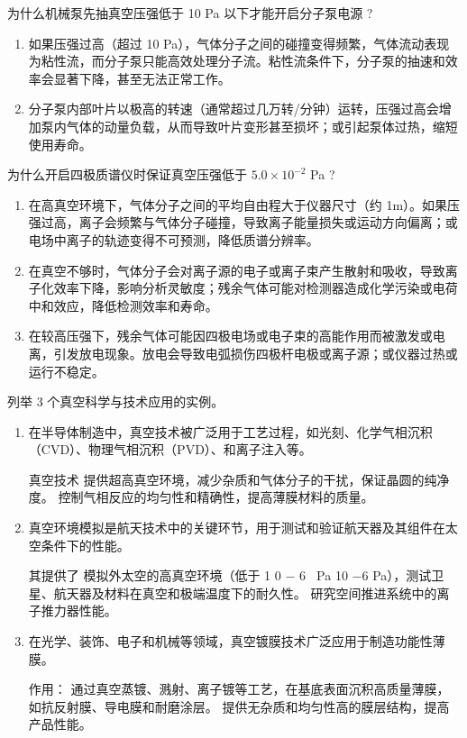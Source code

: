 \documentclass[dvipsnames, svgnames,a4paper,11pt]{article}
\begin{document}
\begin{question}
	为什么机械泵先抽真空压强低于 10 Pa 以下才能开启分子泵电源 ?
\end{question}

	\begin{enumerate}
		\item 如果压强过高（超过 10 Pa），气体分子之间的碰撞变得频繁，气体流动表现为粘性流，而分子泵只能高效处理分子流。粘性流条件下，分子泵的抽速和效率会显著下降，甚至无法正常工作。
		\item 分子泵内部叶片以极高的转速（通常超过几万转/分钟）运转，压强过高会增加泵内气体的动量负载，从而导致叶片变形甚至损坏；或引起泵体过热，缩短使用寿命。
	\end{enumerate}



\begin{question}
	为什么开启四极质谱仪时保证真空压强低于 $5.0 \times 10^{-2}$ Pa ?
\end{question}
	
	\begin{enumerate}
		\item 在高真空环境下，气体分子之间的平均自由程大于仪器尺寸（约 1m）。如果压强过高，离子会频繁与气体分子碰撞，导致离子能量损失或运动方向偏离；或电场中离子的轨迹变得不可预测，降低质谱分辨率。
		\item 在真空不够时，气体分子会对离子源的电子或离子束产生散射和吸收，导致离子化效率下降，影响分析灵敏度；残余气体可能对检测器造成化学污染或电荷中和效应，降低检测效率和寿命。
		\item 在较高压强下，残余气体可能因四极电场或电子束的高能作用而被激发或电离，引发放电现象。放电会导致电弧损伤四极杆电极或离子源；或仪器过热或运行不稳定。
	\end{enumerate}
	


\begin{question}
	列举 3 个真空科学与技术应用的实例。
\end{question}

	\begin{enumerate}
		\item 在半导体制造中，真空技术被广泛用于工艺过程，如光刻、化学气相沉积（CVD）、物理气相沉积（PVD）、和离子注入等。
		
		真空技术
		提供超高真空环境，减少杂质和气体分子的干扰，保证晶圆的纯净度。
		控制气相反应的均匀性和精确性，提高薄膜材料的质量。


		\item 真空环境模拟是航天技术中的关键环节，用于测试和验证航天器及其组件在太空条件下的性能。
		
		其提供了
		模拟外太空的高真空环境（低于 
		1
		0
		−
		6
		 
		Pa
		10 
		−6
		 Pa），测试卫星、航天器及材料在真空和极端温度下的耐久性。
		研究空间推进系统中的离子推力器性能。

		\item 在光学、装饰、电子和机械等领域，真空镀膜技术广泛应用于制造功能性薄膜。
		
		作用：
		通过真空蒸镀、溅射、离子镀等工艺，在基底表面沉积高质量薄膜，如抗反射膜、导电膜和耐磨涂层。
		提供无杂质和均匀性高的膜层结构，提高产品性能。

	\end{enumerate}
\end{document}
